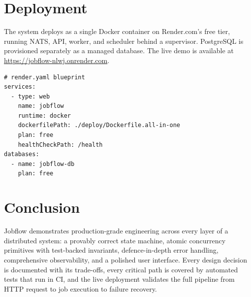 \documentclass[11pt,a4paper]{article}
\begin{document}
\section{Deployment}

The system deploys as a single Docker container on Render.com's free tier,
running NATS, API, worker, and scheduler behind a supervisor. PostgreSQL is
provisioned separately as a managed database. The live demo is available at
\url{https://jobflow-nlwj.onrender.com}.

\begin{lstlisting}
# render.yaml blueprint
services:
  - type: web
    name: jobflow
    runtime: docker
    dockerfilePath: ./deploy/Dockerfile.all-in-one
    plan: free
    healthCheckPath: /health
databases:
  - name: jobflow-db
    plan: free
\end{lstlisting}

\section{Conclusion}

Jobflow demonstrates production-grade engineering across every layer of a
distributed system: a provably correct state machine, atomic concurrency
primitives with test-backed invariants, defence-in-depth error handling,
comprehensive observability, and a polished user interface. Every design
decision is documented with its trade-offs, every critical path is covered by
automated tests that run in CI, and the live deployment validates the full
pipeline from HTTP request to job execution to failure recovery.
\end{document}
